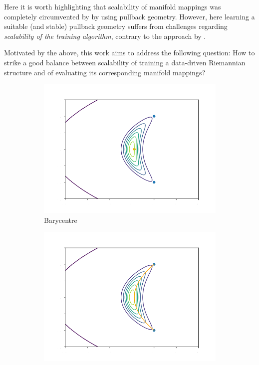 Here it is worth highlighting that scalability of manifold mappings was completely circumvented by \cite{diepeveen2024pulling} by using pullback geometry. 
However, here learning a suitable (and stable) pullback geometry suffers from challenges regarding \emph{scalability of the training algorithm}, contrary to the approach by \cite{sorrenson2024learningdistancesdatanormalizing}.

Motivated by the above, this work aims to address the following question: How to strike a good balance between scalability of training a data-driven Riemannian structure and of evaluating its corresponding manifold mappings?

\begin{figure}[h!]
    \centering
    \begin{subfigure}{0.24\linewidth}
        \includegraphics[width=\linewidth]{Chapter5/results/banana-distribution/barycentre.png}
        \caption{{Barycentre}}
        \label{fig:toy-example-barycentre}
    \end{subfigure}
    \begin{subfigure}{0.24\linewidth}
        \includegraphics[width=\linewidth]{Chapter5/results/banana-distribution/geodesic.png}

\end{subfigure}
\end{figure}

